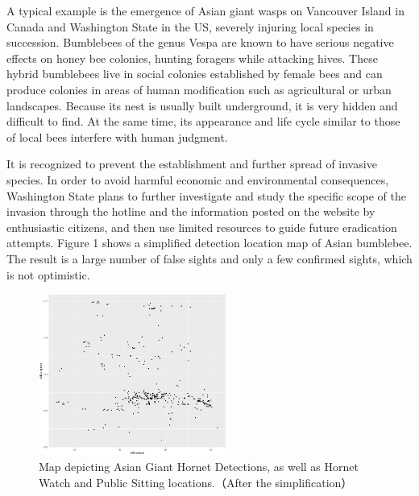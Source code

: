 \documentclass{mcmthesis}
\begin{document}
A typical example is the emergence of Asian giant wasps on Vancouver Island in Canada and Washington State in the US, severely injuring local species in succession. Bumblebees of the genus Vespa are known to have serious negative effects on honey bee colonies, hunting foragers while attacking hives. These hybrid bumblebees live in social colonies established by female bees and can produce colonies in areas of human modification such as agricultural or urban landscapes. Because its nest is usually built underground, it is very hidden and difficult to find. At the same time, its appearance and life cycle similar to those of local bees interfere with human judgment.

It is recognized to prevent the establishment and further spread of invasive species. In order to avoid harmful economic and environmental consequences, Washington State plans to further investigate and study the specific scope of the invasion through the hotline and the information posted on the website by enthusiastic citizens, and then use limited resources to guide future eradication attempts. Figure 1 shows a simplified detection location map of Asian bumblebee. The result is a large number of false sights and only a few confirmed sights, which is not optimistic.

\begin{figure}[H]
	\centering
	\includegraphics[width=0.55\textwidth]{screenshot002}
	\caption{Map depicting Asian Giant Hornet Detections, as well as Hornet Watch and Public Sitting locations.（After the simplification）}
	\label{fig:screenshot002}
\end{figure}
\end{document}
